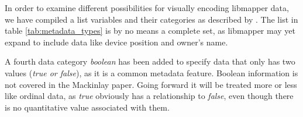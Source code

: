 In order to examine different possibilities for visually encoding libmapper data, we have compiled a list variables and their categories as described by . The list in table \ref{tab:metadata_types} is by no means a complete set, as libmapper may yet expand to include data like device position and owner's name.

A fourth data category \emph{boolean} has been added to specify data that only has two values (\emph{true or false}), as it is a common metadata feature. Boolean information is not covered in the Mackinlay paper. Going forward it will be treated more or less like ordinal data, as \emph{true} obviously has a relationship to \emph{false}, even though there is no quantitative value associated with them.

\newpage

